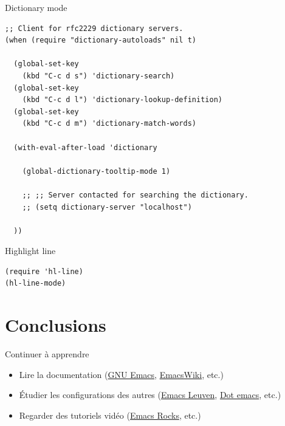 \documentclass[t]{beamer}
\begin{document}
\begin{frame}[fragile,label={sec:orgfecf1f6}]{Dictionary mode}
 \lstset{language=Lisp,label= ,caption= ,captionpos=b,numbers=none}
\begin{lstlisting}
;; Client for rfc2229 dictionary servers.
(when (require "dictionary-autoloads" nil t)

  (global-set-key
    (kbd "C-c d s") 'dictionary-search)
  (global-set-key
    (kbd "C-c d l") 'dictionary-lookup-definition)
  (global-set-key
    (kbd "C-c d m") 'dictionary-match-words)

  (with-eval-after-load 'dictionary

    (global-dictionary-tooltip-mode 1)

    ;; ;; Server contacted for searching the dictionary.
    ;; (setq dictionary-server "localhost")

  ))
\end{lstlisting}
\end{frame}

\begin{frame}[fragile,label={sec:orgf320e7c}]{Highlight line}
 \lstset{language=Lisp,label= ,caption= ,captionpos=b,numbers=none}
\begin{lstlisting}
(require 'hl-line)
(hl-line-mode)
\end{lstlisting}
\end{frame}

\section{Conclusions}
\label{sec:org88719da}

\begin{frame}[label={sec:org31e8e8b}]{Continuer à apprendre}
\begin{itemize}
\item Lire la documentation (\href{http://www.gnu.org/software/emacs/}{GNU Emacs}, \href{http://www.emacswiki.org/}{EmacsWiki}, etc.)
\item Étudier les configurations des autres (\href{https://github.com/fniessen/emacs-leuven}{Emacs Leuven}, \href{http://www.dotemacs.de/}{Dot emacs}, etc.)
\item Regarder des tutoriels vidéo (\href{http://www.emacsrocks.com/}{Emacs Rocks}, etc.)
\end{itemize}
\end{frame}
\end{document}
